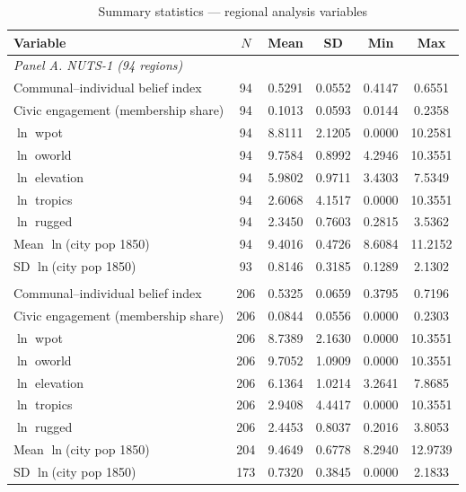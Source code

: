 \begin{table}[!htbp]\centering
\caption{Summary statistics --- regional analysis variables}
\label{tab:sumstat_regional}
\small
\begin{threeparttable}
\begin{tabular}{l c c c c c}
\toprule
Variable & $N$ & Mean & SD & Min & Max \\
\midrule
\multicolumn{6}{l}{\emph{Panel A. NUTS-1 (94 regions)}} \\
Communal--individual belief index & 94 & 0.5291 & 0.0552 & 0.4147 & 0.6551 \\
Civic engagement (membership share) & 94 & 0.1013 & 0.0593 & 0.0144 & 0.2358 \\
$\ln$ wpot & 94 & 8.8111 & 2.1205 & 0.0000 & 10.2581 \\
$\ln$ oworld & 94 & 9.7584 & 0.8992 & 4.2946 & 10.3551 \\
$\ln$ elevation & 94 & 5.9802 & 0.9711 & 3.4303 & 7.5349 \\
$\ln$ tropics & 94 & 2.6068 & 4.1517 & 0.0000 & 10.3551 \\
$\ln$ rugged & 94 & 2.3450 & 0.7603 & 0.2815 & 3.5362 \\
Mean $\ln$(city pop 1850) & 94 & 9.4016 & 0.4726 & 8.6084 & 11.2152 \\
SD $\ln$(city pop 1850) & 93 & 0.8146 & 0.3185 & 0.1289 & 2.1302 \\
\addlinespace
\multicolumn{6}{l}{\emph{Panel B. NUTS-2 (206 regions)}} \\
Communal--individual belief index & 206 & 0.5325 & 0.0659 & 0.3795 & 0.7196 \\
Civic engagement (membership share) & 206 & 0.0844 & 0.0556 & 0.0000 & 0.2303 \\
$\ln$ wpot & 206 & 8.7389 & 2.1630 & 0.0000 & 10.3551 \\
$\ln$ oworld & 206 & 9.7052 & 1.0909 & 0.0000 & 10.3551 \\
$\ln$ elevation & 206 & 6.1364 & 1.0214 & 3.2641 & 7.8685 \\
$\ln$ tropics & 206 & 2.9408 & 4.4417 & 0.0000 & 10.3551 \\
$\ln$ rugged & 206 & 2.4453 & 0.8037 & 0.2016 & 3.8053 \\
Mean $\ln$(city pop 1850) & 204 & 9.4649 & 0.6778 & 8.2940 & 12.9739 \\
SD $\ln$(city pop 1850) & 173 & 0.7320 & 0.3845 & 0.0000 & 2.1833 \\
\bottomrule
\end{tabular}
\end{threeparttable}
\end{table}


